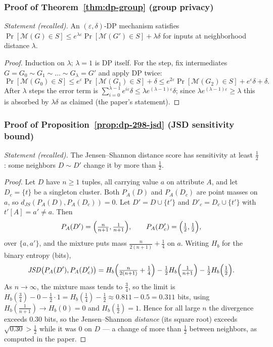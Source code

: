 \subsubsection*{Proof of Theorem~\ref{thm:dp-group} (group privacy)}
{\itshape Statement (recalled).} An $(\varepsilon,\delta)$-DP mechanism satisfies
$\Pr[\mathcal{M}(G) \in S] \le e^{\lambda\varepsilon}\Pr[\mathcal{M}(G') \in S] +
\lambda\delta$ for inputs at neighborhood distance $\lambda$.\eop

\begin{proof}
Induction on $\lambda$; $\lambda = 1$ is DP itself. For the step, fix intermediates
$G = G_0 \sim G_1 \sim \dots \sim G_\lambda = G'$ and apply DP twice:
\[
\Pr[\mathcal{M}(G_0) \in S]
\le e^{\varepsilon}\Pr[\mathcal{M}(G_1) \in S] + \delta
\le e^{2\varepsilon}\Pr[\mathcal{M}(G_2) \in S] + e^{\varepsilon}\delta + \delta.
\]
After $\lambda$ steps the error term is $\sum_{i=0}^{\lambda-1} e^{i\varepsilon}\delta
\le \lambda e^{(\lambda-1)\varepsilon}\delta$; since
$\lambda e^{(\lambda-1)\varepsilon} \ge \lambda$ this is absorbed by
$\lambda\delta$ as claimed (the paper's statement).
\end{proof}

\subsubsection*{Proof of Proposition~\ref{prop:dp-298-jsd} (JSD sensitivity bound)}
{\itshape Statement (recalled).} The Jensen--Shannon distance score has sensitivity at
least $\tfrac12$: some neighbors $D \sim D'$ change it by more than $\tfrac12$.\eop

\begin{proof}
Let $D$ have $n \ge 1$ tuples, all carrying value $a$ on attribute $A$, and let
$D_c = \{t\}$ be a singleton cluster. Both $P_A(D)$ and $P_A(D_c)$ are point masses on
$a$, so $d_{JS}(P_A(D), P_A(D_c)) = 0$. Let $D' = D \cup \{t'\}$ and
$D'_c = D_c \cup \{t'\}$ with $t'[A] = a' \ne a$. Then
\[
P_A(D') = \Bigl(\tfrac{n}{n+1}, \tfrac{1}{n+1}\Bigr),
\qquad
P_A(D'_c) = \Bigl(\tfrac12, \tfrac12\Bigr),
\]
over $\{a, a'\}$, and the mixture puts mass
$\tfrac{n}{2(n+1)} + \tfrac14$ on $a$. Writing $H_b$ for the binary entropy (bits),
\[
\mathit{JSD}\bigl(P_A(D'), P_A(D'_c)\bigr)
= H_b\Bigl(\tfrac{n}{2(n+1)} + \tfrac14\Bigr)
- \tfrac12 H_b\Bigl(\tfrac{1}{n+1}\Bigr)
- \tfrac12 H_b\Bigl(\tfrac12\Bigr).
\]
As $n \to \infty$, the mixture mass tends to $\tfrac34$, so the limit is
$H_b(\tfrac34) - 0 - \tfrac12 \cdot 1 = H_b(\tfrac14) - \tfrac12 \approx 0.811 - 0.5
= 0.311$ bits, using $H_b(\tfrac{1}{n+1}) \to H_b(0) = 0$ and $H_b(\tfrac12) = 1$.
Hence for all large $n$ the divergence exceeds $0.30$ bits, so the Jensen--Shannon
\emph{distance} (its square root) exceeds $\sqrt{0.30} > \tfrac12$ while it was $0$ on
$D$ --- a change of more than $\tfrac12$ between neighbors, as computed in the paper.
\end{proof}

